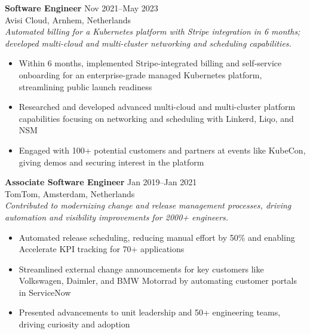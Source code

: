 \documentclass[10pt,a4paper]{article}
\begin{document}
\begin{minipage}[t]{0.64\textwidth}
  {\textbf{Software Engineer} \hfill Nov 2021--May 2023} \\
  Avisi Cloud, Arnhem, Netherlands \\
  \textit{Automated billing for a Kubernetes platform with Stripe integration in 6 months; developed multi-cloud and multi-cluster networking and scheduling capabilities.}
  \begin{itemize}[leftmargin=*]
    \item Within 6 months, implemented Stripe-integrated billing and self-service onboarding for an enterprise-grade managed Kubernetes platform, streamlining public launch readiness
    \item Researched and developed advanced multi-cloud and multi-cluster platform capabilities focusing on networking and scheduling with Linkerd, Liqo, and NSM
    \item Engaged with 100+ potential customers and partners at events like KubeCon, giving demos and securing interest in the platform
  \end{itemize}

  {\textbf{Associate Software Engineer} \hfill Jan 2019--Jan 2021} \\
  TomTom, Amsterdam, Netherlands \\
  \textit{Contributed to modernizing change and release management processes, driving automation and visibility improvements for 2000+ engineers.}
  \begin{itemize}[leftmargin=*]
    \item Automated release scheduling, reducing manual effort by 50\% and enabling Accelerate KPI tracking for 70+ applications
    \item Streamlined external change announcements for key customers like Volkswagen, Daimler, and BMW Motorrad by automating customer portals in ServiceNow
    \item Presented advancements to unit leadership and 50+ engineering teams, driving curiosity and adoption
  \end{itemize}

\end{minipage}
\hfill
\end{document}
